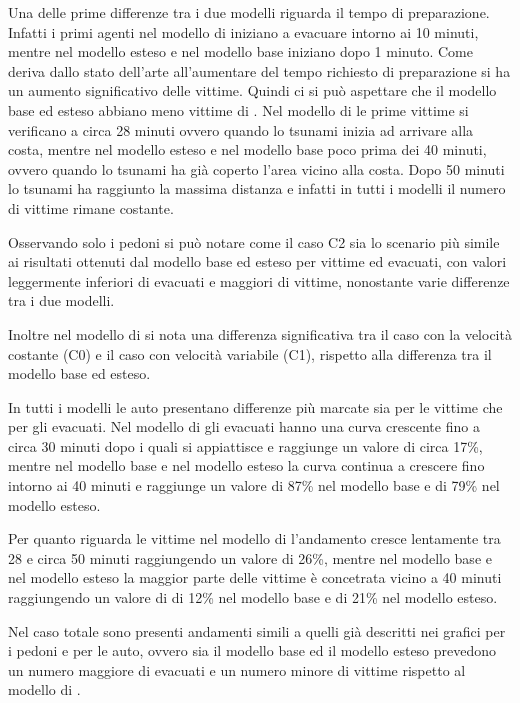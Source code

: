 Una delle prime differenze tra i due modelli riguarda il tempo di preparazione. Infatti i primi agenti nel modello di
\textcite{wang2021novel} iniziano a evacuare intorno ai 10 minuti, mentre nel modello esteso e nel modello base iniziano
dopo 1 minuto.
Come deriva dallo stato dell'arte all'aumentare del tempo richiesto di preparazione si ha un aumento significativo delle vittime.
Quindi ci si può aspettare che il modello base ed esteso abbiano meno vittime di \textcite{wang2021novel}.
%
Nel modello di \textcite{wang2021novel} le prime vittime si verificano a circa 28 minuti ovvero quando lo tsunami inizia ad arrivare alla costa,
mentre nel modello esteso e nel modello base poco prima dei 40 minuti, ovvero quando lo tsunami ha già coperto l'area vicino alla costa.
Dopo 50 minuti lo tsunami ha raggiunto la massima distanza e infatti in tutti i modelli il numero di vittime rimane costante.

Osservando solo i pedoni si può notare come il caso C2 sia lo scenario più simile ai risultati
ottenuti dal modello base ed esteso per vittime ed evacuati, con valori leggermente inferiori di evacuati e maggiori di vittime,
nonostante varie differenze tra i due modelli.

Inoltre nel modello di \textcite{wang2021novel} si nota una differenza significativa
tra il caso con la velocità costante (C0) e il caso con velocità variabile (C1),
rispetto alla differenza tra il modello base ed esteso.

In tutti i modelli le auto presentano differenze più marcate sia per le vittime che per gli evacuati.
Nel modello di \textcite{wang2021novel} gli evacuati hanno una curva crescente fino a circa 30 minuti dopo i quali si appiattisce e raggiunge un valore di circa 17\%,
mentre nel modello base e nel modello esteso la curva continua a crescere fino intorno ai 40 minuti e raggiunge un valore di 87\% nel modello base e di 79\% nel modello esteso.

Per quanto riguarda le vittime nel modello di \textcite{wang2021novel} l'andamento cresce lentamente tra 28 e circa 50 minuti raggiungendo un valore di 26\%, mentre nel
modello base e nel modello esteso la maggior parte delle vittime è concetrata vicino a 40 minuti raggiungendo un valore di di 12\% nel modello base e di 21\% nel modello esteso.

Nel caso totale sono presenti andamenti simili a quelli già descritti nei grafici per i pedoni e per le auto, ovvero sia il modello base ed il modello esteso
prevedono un numero maggiore di evacuati e un numero minore di vittime rispetto al modello di \textcite{wang2021novel}.


